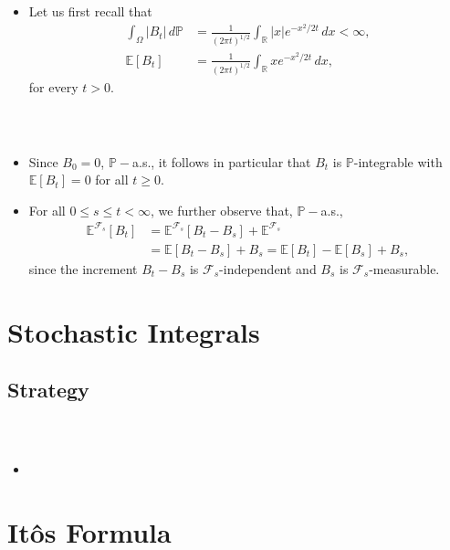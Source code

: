 \documentclass{beamer}
\numberwithin{equation}{section}
\newenvironment{frame2}{\begin{frame}\frametitle{{\normalsize \secname} \\ {\large \subsecname}}}{\end{frame}}
\begin{document}
\begin{frame2}
    \begin{itemize} 
        \item Let us first recall that
        \begin{align}
            \int_{\Omega} |B_t| \, d\mathbb{P} &= \frac{1}{(2\pi t)^{1/2}}\int_\mathbb{R} |x| e^{-x^2/2t} \, dx < \infty, \\
            \mathbb{E}[B_t] &= \frac{1}{(2\pi t)^{1/2}}\int_\mathbb{R}xe^{-x^2/2t} \, dx,
        \end{align}
        for every $t > 0$.
    \end{itemize}
\end{frame2}

\begin{frame2}
    \begin{itemize}
        \item Since $B_0 = 0$, $\mathbb{P}-$a.s., it follows in particular that $B_t$ is $\mathbb{P}$-integrable with $\mathbb{E}[B_t] = 0$ for all $t \geq 0$.
        \item For all $0 \leq s \leq t < \infty$, we further observe that, $\mathbb{P}-$a.s.,
        \begin{align}
            \mathbb{E}^{\mathcal{F}_s}[B_t] &= \mathbb{E}^{\mathcal{F}_s}[B_t - B_s] + \mathbb{E}^{\mathcal{F}_s} \\
             &= \mathbb{E}[B_t - B_s] + B_s = \mathbb{E}[B_t] - \mathbb{E}[B_s] + B_s, 
        \end{align}
        since the increment $B_t - B_s$ is $\mathcal{F}_s$-independent and $B_s$ is $\mathcal{F}_s$-measurable.
    \end{itemize}
\end{frame2}

\section{Stochastic Integrals}

\subsection{Strategy}
\begin{frame2}
    \begin{itemize}
        \item 
    \end{itemize}
\end{frame2}

\section{Itôs Formula}
\end{document}
